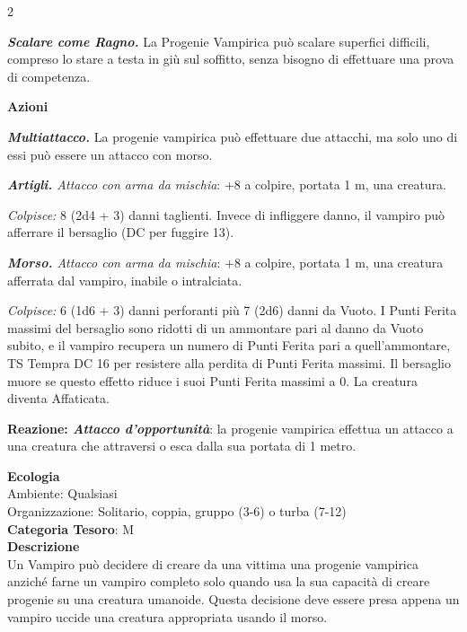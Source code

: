 \begin{multicols}{2}
{\emph{\textbf{Scalare come Ragno.}} La Progenie Vampirica può scalare superfici difficili, compreso lo stare a testa in giù sul soffitto, senza bisogno di effettuare una prova di competenza.

\textbf{Azioni}

\emph{\textbf{Multiattacco.}} La progenie vampirica può effettuare due attacchi, ma solo uno di essi può essere un attacco con morso.

\emph{\textbf{Artigli.} Attacco con arma da mischia}: +8 a colpire, portata 1 m, una creatura.

\emph{Colpisce:} 8 (2d4 + 3) danni taglienti. Invece di infliggere danno, il vampiro può afferrare il bersaglio (DC per fuggire 13).

\emph{\textbf{Morso.} Attacco con arma da mischia}: +8 a colpire, portata 1 m, una creatura afferrata dal vampiro, inabile o intralciata.

\emph{Colpisce:} 6 (1d6 + 3) danni perforanti più 7 (2d6) danni da Vuoto. I Punti Ferita massimi del bersaglio sono ridotti di un ammontare pari al danno da Vuoto subito, e il vampiro recupera un numero di Punti Ferita pari a quell'ammontare, TS Tempra DC 16 per resistere alla perdita di Punti Ferita massimi. Il bersaglio muore se questo effetto riduce i suoi Punti Ferita massimi a 0. La creatura diventa Affaticata.

\textbf{Reazione: \emph{Attacco d'opportunità}}: la progenie vampirica effettua un attacco a una creatura che attraversi o esca dalla sua portata di 1 metro.

\textbf{Ecologia}\\
Ambiente: Qualsiasi\\
Organizzazione: Solitario, coppia, gruppo (3-6) o turba (7-12)\\
\textbf{Categoria Tesoro}: M\\
\textbf{Descrizione}\\
Un Vampiro può decidere di creare da una vittima una progenie vampirica anziché farne un vampiro completo solo quando usa la sua capacità di creare progenie su una creatura umanoide. Questa decisione deve essere presa appena un vampiro uccide una creatura appropriata usando il morso.

}
\end{multicols}

